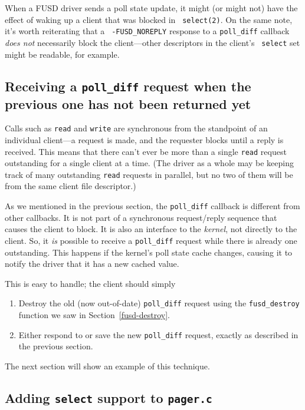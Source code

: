 \documentclass{article}
\begin{document}
When a FUSD driver sends a poll state update, it might (or might not)
have the effect of waking up a client that was blocked in {\tt
select(2)}.  On the same note, it's worth reiterating that a {\tt
-FUSD\_NOREPLY} response to a {\tt poll\_diff} callback {\em does not}
necessarily block the client---other descriptors in the client's {\tt
select} set might be readable, for example.

\subsection{Receiving a {\tt poll\_diff} request when the previous one
has not been returned yet}
\label{multiple-polldiffs}

Calls such as {\tt read} and {\tt write} are synchronous from the
standpoint of an individual client---a request is made, and the
requester blocks until a reply is received.  This means that there
can't ever be more than a single {\tt read} request outstanding for a
single client at a time.  (The driver as a whole may be keeping track
of many outstanding {\tt read} requests in parallel, but no two of them will
be from the same client file descriptor.)

As we mentioned in the previous section, the {\tt poll\_diff} callback
is different from other callbacks.  It is not part of a synchronous
request/reply sequence that causes the client to block.  It is also an
interface to the {\em kernel}, not directly to the client.  So, it
{\em is} possible to receive a {\tt poll\_diff} request while there is
already one outstanding.  This happens if the kernel's poll state
cache changes, causing it to notify the driver that it has a new
cached value.

This is easy to handle; the client should simply
\begin{enumerate}
\item Destroy the old (now out-of-date) {\tt poll\_diff} request
using the {\tt fusd\_destroy} function we saw in
Section~\ref{fusd-destroy}.
\item Either respond to or save the new {\tt poll\_diff} request,
exactly as described in the previous section.
\end{enumerate}

The next section will show an example of this technique.


\subsection{Adding {\tt select} support to {\tt pager.c}}
\end{document}
